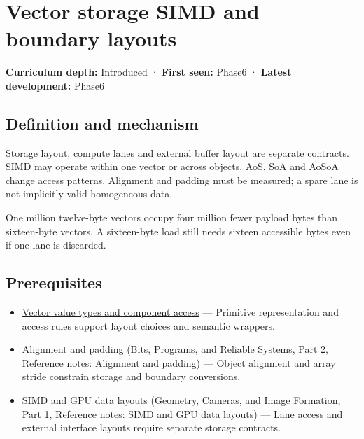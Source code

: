 \hypertarget{appendix-26bf6bf2fb8b}{}\label{referencestart:appendix-26bf6bf2fb8b}
\section{Vector storage SIMD and boundary layouts}\label{appendix-26bf6bf2fb8b-vector-storage-simd-and-boundary-layouts}

\hypertarget{appendix-26bf6bf2fb8b-vector-storage-simd-and-boundary-layouts}{}

\textbf{Curriculum depth:} Introduced · \textbf{First seen:} Phase6 · \textbf{Latest development:} Phase6

\begin{allmightroledefinition}

\subsection{Definition and mechanism}\label{appendix-26bf6bf2fb8b-definition-and-mechanism}

\hypertarget{appendix-26bf6bf2fb8b-definition-and-mechanism}{}

Storage layout, compute lanes and external buffer layout are separate contracts. SIMD may operate within one vector or across objects. AoS, SoA and AoSoA change access patterns. Alignment and padding must be measured; a spare lane is not implicitly valid homogeneous data.

\end{allmightroledefinition}

One million twelve-byte vectors occupy four million fewer payload bytes than sixteen-byte vectors. A sixteen-byte load still needs sixteen accessible bytes even if one lane is discarded.

\subsection{Prerequisites}\label{appendix-26bf6bf2fb8b-prerequisites}

\hypertarget{appendix-26bf6bf2fb8b-prerequisites}{}

\begin{itemize}
\tightlist
\item
  \hyperref[appendix-37a39984ba66]{Vector value types and component access} --- Primitive representation and access rules support layout choices and semantic wrappers.
\item
  \href{../01-Bits-Programs-and-Reliable-Systems-P02/main.pdf\#nameddest=appendix-a1f7c53b4742}{Alignment and padding (Bits, Programs, and Reliable Systems, Part 2, Reference notes: Alignment and padding)} --- Object alignment and array stride constrain storage and boundary conversions.
\item
  \href{../03-Geometry-Cameras-and-Image-Formation-P01/main.pdf\#nameddest=appendix-3c7b1a56de01}{SIMD and GPU data layouts (Geometry, Cameras, and Image Formation, Part 1, Reference notes: SIMD and GPU data layouts)} --- Lane access and external interface layouts require separate storage contracts.
\end{itemize}

